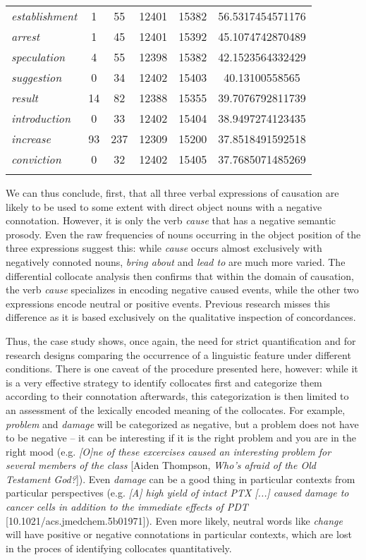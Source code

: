 \begin{table}[!htbp]
{\begin{tabular}[t]{l *{4}{S[table-format=5]} S}
\textit{establishment} & 1 & 55 & 12401 & 15382 & 56.5317454571176 \\
\textit{arrest} & 1 & 45 & 12401 & 15392 & 45.1074742870489 \\
\textit{speculation} & 4 & 55 & 12398 & 15382 & 42.1523564332429 \\
\textit{suggestion} & 0 & 34 & 12402 & 15403 & 40.13100558565 \\
\textit{result} & 14 & 82 & 12388 & 15355 & 39.7076792811739 \\
\textit{introduction} & 0 & 33 & 12402 & 15404 & 38.9497274123435 \\
\textit{increase} & 93 & 237 & 12309 & 15200 & 37.8518491592518 \\
\textit{conviction} & 0 & 32 & 12402 & 15405 & 37.7685071485269 \\
\lspbottomrule
\end{tabular}}
\end{table}

We can thus conclude, first, that all three verbal expressions of causation are likely to be used to some extent with direct object nouns with a negative connotation. However, it is only the verb \textit{cause} that has a negative semantic prosody. Even the raw frequencies of nouns occurring in the object position of the three expressions suggest this: while \textit{cause} occurs almost exclusively with negatively connoted nouns, \textit{bring about} and \textit{lead to} are much more varied. The differential collocate analysis then confirms that within the domain of causation, the verb \textit{cause} specializes in encoding negative caused events, while the other two expressions encode neutral or positive events. Previous research \citep{louw_semantic_2010} misses this difference as it is based exclusively on the qualitative inspection of concordances.

Thus, the case study shows, once again, the need for strict quantification and for research designs comparing the occurrence of a linguistic feature under different conditions. There is one caveat of the procedure presented here, however: while it is a very effective strategy to identify collocates first and categorize them according to their connotation afterwards, this categorization is then limited to an assessment of the lexically encoded meaning of the collocates. For example, \textit{problem} and \textit{damage} will be categorized as negative, but a problem does not have to be negative -- it can be interesting if it is the right problem and you are in the right mood (e.g. \textit{[O]ne of these excercises caused an interesting problem for several members of the class} [Aiden Thompson, \textit{Who's afraid of the Old Testament God?}]). Even \textit{damage} can be a good thing in particular contexts from particular perspectives (e.g. \textit{[A] high yield of intact PTX [...] caused damage to cancer cells in addition to the immediate effects of PDT} [10.1021/acs.jmedchem.5b01971]). Even more likely, neutral words like \textit{change} will have positive or negative connotations in particular contexts, which are lost in the proces of identifying collocates quantitatively.

